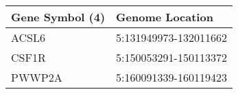 \begin{tabular}{ll}
\toprule
Gene Symbol (4) &       Genome Location \\
\midrule
          ACSL6 & 5:131949973-132011662 \\
          CSF1R & 5:150053291-150113372 \\
         PWWP2A & 5:160091339-160119423 \\
\bottomrule
\end{tabular}
